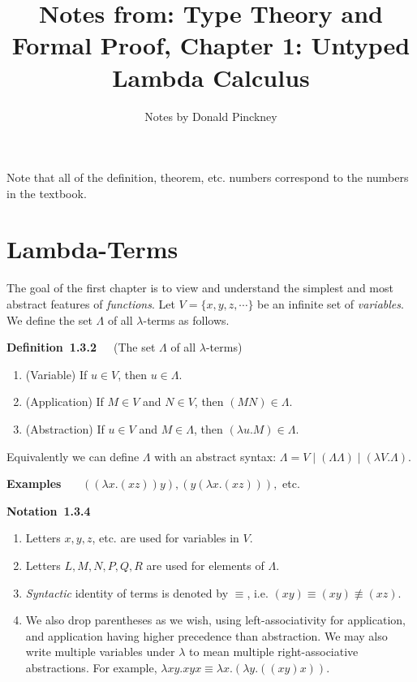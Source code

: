 \documentclass[letterpaper]{article}
\author{Notes by Donald Pinckney}
\title{Notes from: Type Theory and Formal Proof, Chapter 1: Untyped Lambda Calculus}
\newenvironment{notation}[2][]{\par\medskip
	\noindent \textbf{Notation~#2}~~~#1 \rmfamily\em}{\medskip}
\newenvironment{examplesNonNum}[1][]{\par\medskip
	\noindent \textbf{Examples}~~~#1 \rmfamily}{\medskip}
\newenvironment{definition}[2][]{\par\medskip
	\noindent \textbf{Definition~#2}~~~#1 \rmfamily}{\medskip}
\begin{document}
\maketitle

Note that all of the definition, theorem, etc. numbers correspond to the numbers in the textbook.

\section{Lambda-Terms}

The goal of the first chapter is to view and understand the simplest and most abstract features of \emph{functions}. Let $V = \{x, y, z, \cdots\}$ be an infinite set of \emph{variables}. We define the set $\Lambda$ of all $\lambda$-terms as follows.

\begin{definition}[(The set $\Lambda$ of all $\lambda$-terms)]{1.3.2}
	\begin{enumerate}
		\item (Variable) If $u \in V$, then $u \in \Lambda$.
		\item (Application) If $M \in V$ and $N \in V$, then $(M N) \in \Lambda$.
		\item (Abstraction) If $u \in V$ and $M \in \Lambda$, then $(\lambda u.M) \in \Lambda$.
	\end{enumerate}
	Equivalently we can define $\Lambda$ with an abstract syntax: $\Lambda = V \mid (\Lambda \Lambda) \mid (\lambda V . \Lambda)$.
\end{definition}

\begin{examplesNonNum}
	$((\lambda x.(x z)) y), (y(\lambda x.(x z))), $ etc.
\end{examplesNonNum}

\begin{notation}{1.3.4}
	\begin{enumerate}
		\item Letters $x, y, z$, etc. are used for variables in $V$.
		\item Letters $L, M, N, P, Q, R$ are used for elements of $\Lambda$.
		\item \emph{Syntactic} identity of terms is denoted by $\equiv$, i.e. $(x y) \equiv (x y) \not \equiv (x z)$.
		\item We also drop parentheses as we wish, using left-associativity for application, and application having higher precedence than abstraction. We may also write multiple variables under $\lambda$ to mean multiple right-associative abstractions. For example, $\lambda xy.x y x \equiv \lambda x . (\lambda y. ((x y) x))$.
	\end{enumerate}
\end{notation}
\end{document}
